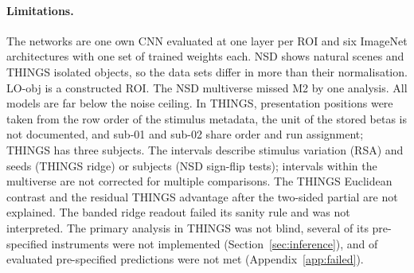 \paragraph{Limitations.}
The networks are one own CNN evaluated at one layer per ROI and six ImageNet architectures with one set of
trained weights each. NSD shows natural scenes and THINGS isolated objects, so the data sets differ in more
than their normalisation. LO-obj is a constructed ROI. The NSD multiverse missed M2 by one analysis. All
models are far below the noise ceiling. In THINGS, presentation positions were taken from the row order of
the stimulus metadata, the unit of the stored betas is not documented, and sub-01 and sub-02 share order
and run assignment; THINGS has three subjects. The intervals describe stimulus variation (RSA) and seeds
(THINGS ridge) or subjects (NSD sign-flip tests); intervals within the multiverse are not corrected for
multiple comparisons. The THINGS Euclidean contrast and the residual THINGS advantage after the two-sided
partial are not explained. The banded ridge readout failed its sanity rule and was not interpreted. The
primary analysis in THINGS was not blind, several of its pre-specified instruments were not implemented
(Section~\ref{sec:inference}), and \FailedPredictions{} of \TotalPredictions{} evaluated pre-specified
predictions were not met (Appendix~\ref{app:failed}).
